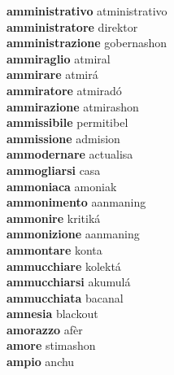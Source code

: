 \textbf{amministrativo } atministrativo \\
\textbf{amministratore } direktor \\
\textbf{amministrazione } gobernashon \\
\textbf{ammiraglio } atmiral \\
\textbf{ammirare } atmirá \\
\textbf{ammiratore } atmiradó \\
\textbf{ammirazione } atmirashon \\
\textbf{ammissibile } permitibel \\
\textbf{ammissione } admision \\
\textbf{ammodernare } actualisa \\
\textbf{ammogliarsi } casa \\
\textbf{ammoniaca } amoniak \\
\textbf{ammonimento } aanmaning \\
\textbf{ammonire } kritiká \\
\textbf{ammonizione } aanmaning \\
\textbf{ammontare } konta \\
\textbf{ammucchiare } kolektá \\
\textbf{ammucchiarsi } akumulá \\
\textbf{ammucchiata } bacanal \\
\textbf{amnesia } blackout \\
\textbf{amorazzo } afèr \\
\textbf{amore } stimashon \\
\textbf{ampio } anchu \\
